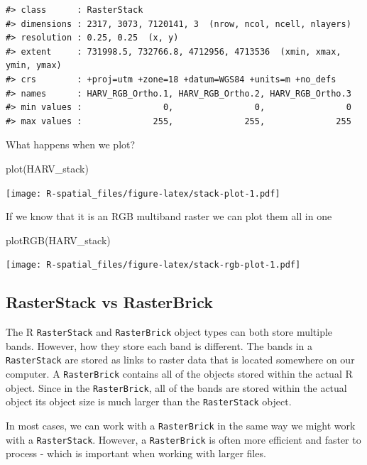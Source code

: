\documentclass[
  11pt,
]{book}
\newenvironment{Shaded}{\begin{snugshade}}{\end{snugshade}}
\newcommand{\FunctionTok}[1]{\textcolor[rgb]{0.00,0.00,0.00}{#1}}
\newcommand{\NormalTok}[1]{#1}
\begin{document}
\begin{verbatim}
#> class      : RasterStack 
#> dimensions : 2317, 3073, 7120141, 3  (nrow, ncol, ncell, nlayers)
#> resolution : 0.25, 0.25  (x, y)
#> extent     : 731998.5, 732766.8, 4712956, 4713536  (xmin, xmax, ymin, ymax)
#> crs        : +proj=utm +zone=18 +datum=WGS84 +units=m +no_defs 
#> names      : HARV_RGB_Ortho.1, HARV_RGB_Ortho.2, HARV_RGB_Ortho.3 
#> min values :                0,                0,                0 
#> max values :              255,              255,              255
\end{verbatim}

What happens when we plot?

\begin{Shaded}
\begin{Highlighting}[]
\FunctionTok{plot}\NormalTok{(HARV\_stack)}
\end{Highlighting}
\end{Shaded}

\texttt{[image: R-spatial\_files/figure-latex/stack-plot-1.pdf]}

If we know that it is an RGB multiband raster we can plot them all in one

\begin{Shaded}
\begin{Highlighting}[]
\FunctionTok{plotRGB}\NormalTok{(HARV\_stack)}
\end{Highlighting}
\end{Shaded}

\texttt{[image: R-spatial\_files/figure-latex/stack-rgb-plot-1.pdf]}

\hypertarget{rasterstack-vs-rasterbrick}{%
\subsection{RasterStack vs RasterBrick}\label{rasterstack-vs-rasterbrick}}

The R \texttt{RasterStack} and \texttt{RasterBrick} object types can both store multiple bands. However, how they store each band is different. The bands in a \texttt{RasterStack} are stored as links to raster data that is located somewhere on our computer. A \texttt{RasterBrick} contains all of the objects stored within the actual R object. Since in the \texttt{RasterBrick}, all of the bands are stored within the actual object its object size is much larger than the \texttt{RasterStack} object.

In most cases, we can work with a \texttt{RasterBrick} in the same way we might work with a \texttt{RasterStack}. However, a \texttt{RasterBrick} is often more efficient and faster to process - which is important when working with larger files.
\end{document}
